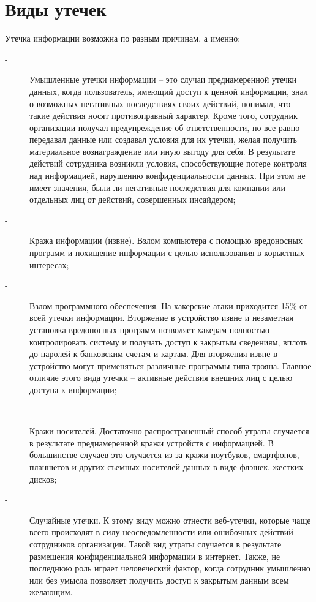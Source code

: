 \section{Виды утечек}

Утечка информации возможна по разным причинам, а именно:

\begin{description}
	\item[-]
		Умышленные утечки информации – это случаи преднамеренной утечки данных, когда пользователь, имеющий доступ к ценной информации, знал о возможных негативных последствиях своих действий, понимал, что такие действия носят противоправный характер. Кроме того, сотрудник организации получал предупреждение об ответственности, но все равно передавал данные или создавал условия для их утечки, желая получить материальное вознаграждение или иную выгоду для себя. В результате действий сотрудника возникли условия, способствующие потере контроля над информацией, нарушению конфиденциальности данных. При этом не имеет значения, были ли негативные последствия для компании или отдельных лиц от действий, совершенных инсайдером;

	\item[-]
		Кража информации (извне). Взлом компьютера с помощью вредоносных программ и похищение информации с целью использования в корыстных интересах;  
	\item[-]
		Взлом программного обеспечения. На хакерские атаки приходится 15\% от всей утечки информации. Вторжение в устройство извне и незаметная установка вредоносных программ позволяет хакерам полностью контролировать систему и получать доступ к закрытым сведениям, вплоть до паролей к банковским счетам и картам. Для вторжения извне в устройство могут применяться различные программы типа трояна. Главное отличие этого вида утечки – активные действия внешних лиц с целью доступа к информации;
	\item[-] 
	    Кражи носителей. Достаточно распространенный способ утраты случается в результате преднамеренной кражи устройств с информацией. В большинстве случаев это случается из-за кражи ноутбуков, смартфонов, планшетов и других съемных носителей данных в виде флэшек, жестких дисков;
	\item[-] 
	    Случайные утечки. К этому виду можно отнести веб-утечки, которые чаще всего происходят в силу неосведомленности или ошибочных действий сотрудников организации. Такой вид утраты случается в результате размещения конфиденциальной информации в интернет. Также, не последнюю роль играет человеческий фактор, когда сотрудник умышленно или без умысла позволяет получить доступ к закрытым данным всем желающим.
\end{description}

